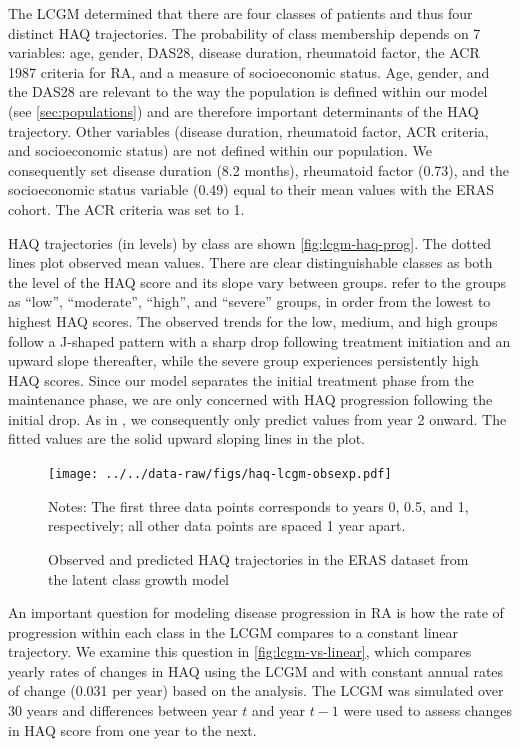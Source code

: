 \documentclass[11pt,final,fleqn]{article}\usepackage[]{graphicx}\usepackage[]{color}
\theoremstyle{plain}
\begin{document}
The \citet{norton2014health} LCGM determined that there are four classes of patients and thus four distinct HAQ trajectories. The probability of class membership depends on 7 variables: age, gender, DAS28, disease duration, rheumatoid factor, the ACR 1987 criteria for RA, and a measure of socioeconomic status. Age, gender, and the DAS28 are relevant to the way the population is defined within our model (see \autoref{sec:populations}) and are therefore important determinants of the HAQ trajectory. Other variables (disease duration, rheumatoid factor, ACR criteria, and socioeconomic status) are not defined within our population. We consequently set disease duration (8.2 months), rheumatoid factor (0.73), and the socioeconomic status variable (0.49) equal to their mean values with the ERAS cohort. The ACR criteria was set to 1. 

HAQ trajectories (in levels) by class are shown \autoref{fig:lcgm-haq-prog}. The dotted lines plot observed mean values. There are clear distinguishable classes as both the level of the HAQ score and its slope vary between groups. \citet{norton2014health} refer to the groups as ``low'', ``moderate'', ``high'', and ``severe'' groups, in order from the lowest to highest HAQ scores. The observed trends for the low, medium, and high groups follow a J-shaped pattern with a sharp drop following treatment initiation and an upward slope thereafter, while the severe group experiences persistently high HAQ scores. Since our model separates the initial treatment phase from the maintenance phase, we are only concerned with HAQ progression following the initial drop. As in \citet{stevenson2016adalimumab}, we consequently only predict values from year 2 onward. The fitted values are the solid upward sloping lines in the plot.  
\begin{figure}[H]
\centering
\texttt{[image: ../../data-raw/figs/haq-lcgm-obsexp.pdf]}
\caption{Observed and predicted HAQ trajectories in the ERAS dataset from the latent class growth model}\label{fig:lcgm-haq-prog}
\begin{minipage}{\linewidth}
\footnotesize
Notes: The first three data points corresponds to years 0, 0.5, and 1, respectively; all other data points are spaced 1 year apart.
\end{minipage}
\end{figure}



An important question for modeling disease progression in RA is how the rate of progression within each class in the LCGM compares to a constant linear trajectory. We examine this question in \autoref{fig:lcgm-vs-linear}, which compares yearly rates of changes in HAQ using the LCGM and with constant annual rates of change (0.031 per year) based on the \citet{wolfe2010loss} analysis. The LCGM was simulated over 30 years and differences between year $t$ and year $t-1$ were used to assess changes in HAQ score from one year to the next.  
\end{document}
